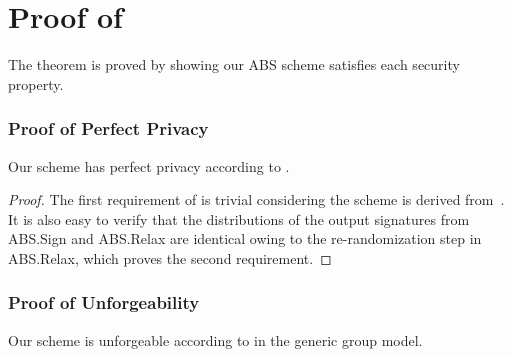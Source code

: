 \chapter{Proof of \texorpdfstring{}{Theorem~\ref{thm:access-control:abs-sec}}}%
\label{app:access-control-abs-sec}

\abssecuritytheorem*

The theorem is proved by showing our ABS scheme satisfies each security property.

\subsection{Proof of Perfect Privacy}

\begin{lemma}\label{lemma:access-control:abs-privacy}
  Our scheme has perfect privacy according to .
\end{lemma}

\begin{proof}
  The first requirement of  is trivial considering the scheme is derived from~\cite{10.1007/978-3-642-19074-2_24}. It is also easy to verify that the distributions of the output signatures from \textsf{ABS.Sign} and \textsf{ABS.Relax} are identical owing to the re-randomization step in \textsf{ABS.Relax}, which proves the second requirement.
\end{proof}

\subsection{Proof of Unforgeability}

\begin{lemma}\label{lemma:access-control:abs-unf}
  Our scheme is unforgeable according to  in the generic group model.
\end{lemma}

\newcommand{\Lin}{\textsf{Lin}}
\newcommand{\Hom}{\textsf{Hom}}

